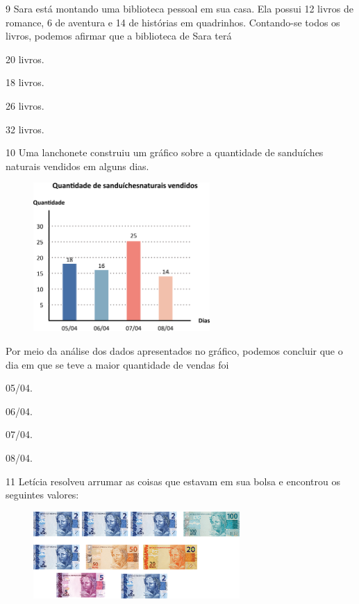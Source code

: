 \num{9} Sara está montando uma biblioteca pessoal em sua casa. Ela possui 12 livros de romance, 6 de aventura e 14 de histórias em quadrinhos. Contando-se todos os livros, podemos afirmar que a biblioteca de Sara terá

\begin{multicols}{2}
\begin{escolha}
\item
  20 livros.
\item
  18 livros.
\item
  26 livros.
\item
  32 livros.
\end{escolha}
\end{multicols}

\num{10} Uma lanchonete construiu um gráfico sobre a quantidade de sanduíches
naturais vendidos em alguns dias.

\begin{figure}[htpb!]
\centering
\includegraphics[width=0.6\textwidth]{./media/image109.png}
\end{figure}

Por meio da análise dos dados apresentados no gráfico, podemos concluir que o dia em que se teve a maior quantidade de vendas foi

\begin{multicols}{2}
\begin{escolha}
\item
  05/04.
\item
  06/04.
\item
  07/04.
\item
  08/04.
\end{escolha}
\end{multicols}

\num{11} Letícia resolveu arrumar as coisas que estavam em sua bolsa e encontrou os seguintes valores:

\begin{figure}[htpb!]
\centering
\includegraphics[width=0.7\textwidth]{./media/image110.png}
\end{figure}

